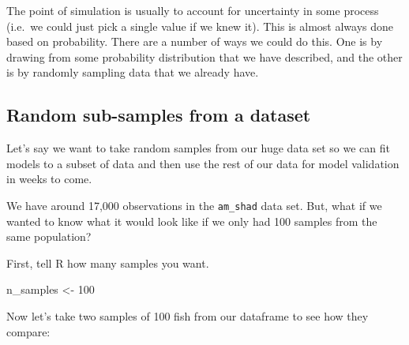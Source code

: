 \documentclass[
]{book}
\newenvironment{Shaded}{\begin{snugshade}}{\end{snugshade}}
\newcommand{\CommentTok}[1]{\textcolor[rgb]{0.56,0.35,0.01}{\textit{#1}}}
\newcommand{\DataTypeTok}[1]{\textcolor[rgb]{0.13,0.29,0.53}{#1}}
\newcommand{\DecValTok}[1]{\textcolor[rgb]{0.00,0.00,0.81}{#1}}
\newcommand{\KeywordTok}[1]{\textcolor[rgb]{0.13,0.29,0.53}{\textbf{#1}}}
\newcommand{\NormalTok}[1]{#1}
\newcommand{\OperatorTok}[1]{\textcolor[rgb]{0.81,0.36,0.00}{\textbf{#1}}}
\newcommand{\OtherTok}[1]{\textcolor[rgb]{0.56,0.35,0.01}{#1}}
\newcommand{\StringTok}[1]{\textcolor[rgb]{0.31,0.60,0.02}{#1}}
\begin{document}
The point of simulation is usually to account for uncertainty in some process (i.e.~we could just pick a single value if we knew it). This is almost always done based on probability. There are a number of ways we could do this. One is by drawing from some probability distribution that we have described, and the other is by randomly sampling data that we already have.

\hypertarget{random-sub-samples-from-a-dataset}{%
\subsection{Random sub-samples from a dataset}\label{random-sub-samples-from-a-dataset}}

Let's say we want to take random samples from our huge data set so we can fit models to a subset of data and then use the rest of our data for model validation in weeks to come.

We have around 17,000 observations in the \texttt{am\_shad} data set. But, what if we wanted to know what it would look like if we only had 100 samples from the same population?

First, tell R how many samples you want.

\begin{Shaded}
\begin{Highlighting}[]
\NormalTok{n_samples <-}\StringTok{ }\DecValTok{100}
\end{Highlighting}
\end{Shaded}

Now let's take two samples of 100 fish from our dataframe to see how they compare:

\begin{Shaded}
\end{Shaded}
\end{document}
